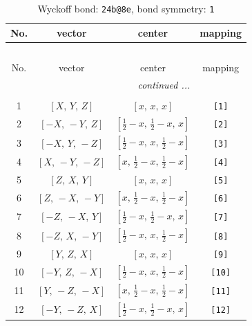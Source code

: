 \documentclass[fleqn,8pt]{jsarticle}
\begin{document}
\begin{longtable}{cccc}
\caption{Wyckoff bond: {\tt 24b@8e}, bond symmetry: {\tt 1}}
 \\
 \hline \hline
No. & vector & center & mapping \\ \hline \endfirsthead

\multicolumn{3}{l}{\tablename\ \thetable{}} \\
 \hline \hline
No. & vector & center & mapping \\ \hline \endhead

 \hline \hline
\multicolumn{3}{r}{\footnotesize\it continued ...} \\ \endfoot

 \hline \hline
\multicolumn{3}{r}{} \\ \endlastfoot

1 & $\left[ X,\, Y,\, Z \right]$ & $\left[ x,\, x,\, x \right]$ & {\tt [1]} \\ \hline
2 & $\left[ - X,\, - Y,\, Z \right]$ & $\left[ \frac{1}{2} - x,\, \frac{1}{2} - x,\, x \right]$ & {\tt [2]} \\ \hline
3 & $\left[ - X,\, Y,\, - Z \right]$ & $\left[ \frac{1}{2} - x,\, x,\, \frac{1}{2} - x \right]$ & {\tt [3]} \\ \hline
4 & $\left[ X,\, - Y,\, - Z \right]$ & $\left[ x,\, \frac{1}{2} - x,\, \frac{1}{2} - x \right]$ & {\tt [4]} \\ \hline
5 & $\left[ Z,\, X,\, Y \right]$ & $\left[ x,\, x,\, x \right]$ & {\tt [5]} \\ \hline
6 & $\left[ Z,\, - X,\, - Y \right]$ & $\left[ x,\, \frac{1}{2} - x,\, \frac{1}{2} - x \right]$ & {\tt [6]} \\ \hline
7 & $\left[ - Z,\, - X,\, Y \right]$ & $\left[ \frac{1}{2} - x,\, \frac{1}{2} - x,\, x \right]$ & {\tt [7]} \\ \hline
8 & $\left[ - Z,\, X,\, - Y \right]$ & $\left[ \frac{1}{2} - x,\, x,\, \frac{1}{2} - x \right]$ & {\tt [8]} \\ \hline
9 & $\left[ Y,\, Z,\, X \right]$ & $\left[ x,\, x,\, x \right]$ & {\tt [9]} \\ \hline
10 & $\left[ - Y,\, Z,\, - X \right]$ & $\left[ \frac{1}{2} - x,\, x,\, \frac{1}{2} - x \right]$ & {\tt [10]} \\ \hline
11 & $\left[ Y,\, - Z,\, - X \right]$ & $\left[ x,\, \frac{1}{2} - x,\, \frac{1}{2} - x \right]$ & {\tt [11]} \\ \hline
12 & $\left[ - Y,\, - Z,\, X \right]$ & $\left[ \frac{1}{2} - x,\, \frac{1}{2} - x,\, x \right]$ & {\tt [12]} \\ \hline

\end{longtable}
\end{document}

